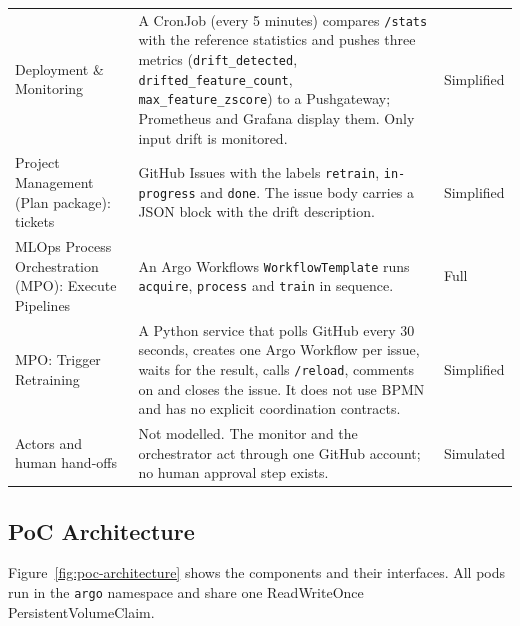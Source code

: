 {\begin{longtable}{@{}>{\raggedright\arraybackslash}p{3.7cm} >{\raggedright\arraybackslash}p{6.6cm} >{\raggedright\arraybackslash}p{1.9cm}@{}}
Deployment \& Monitoring & A CronJob (every 5 minutes) compares \texttt{/stats} with the reference statistics and pushes three metrics (\texttt{drift\_detected}, \texttt{drifted\_feature\_count}, \texttt{max\_feature\_zscore}) to a Pushgateway; Prometheus and Grafana display them. Only input drift is monitored. & Simplified \\
Project Management (Plan package): tickets & GitHub Issues with the labels \texttt{retrain}, \texttt{in-progress} and \texttt{done}. The issue body carries a JSON block with the drift description. & Simplified \\
MLOps Process Orchestration (MPO): Execute Pipelines & An Argo Workflows \texttt{WorkflowTemplate} runs \texttt{acquire}, \texttt{process} and \texttt{train} in sequence. & Full \\
MPO: Trigger Retraining & A Python service that polls GitHub every 30 seconds, creates one Argo Workflow per issue, waits for the result, calls \texttt{/reload}, comments on and closes the issue. It does not use BPMN and has no explicit coordination contracts. & Simplified \\
Actors and human hand-offs & Not modelled. The monitor and the orchestrator act through one GitHub account; no human approval step exists. & Simulated \\
\end{longtable}
}

\subsection{PoC Architecture}

Figure~\ref{fig:poc-architecture} shows the components and their interfaces. All pods run in the \texttt{argo} namespace and share one ReadWriteOnce PersistentVolumeClaim.

